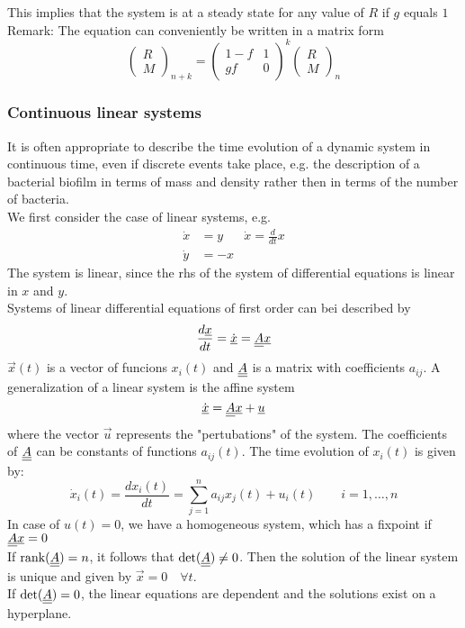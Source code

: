 This implies that the system is at a steady state for any value of $R$ if $g$ equals $\num{1}$\\
Remark: The equation can conveniently be written in a matrix form
\begin{equation*}
	\begin{pmatrix} R \\ M\end{pmatrix}_{n+k}=\begin{pmatrix} 1-f & 1 \\ gf & 0 \end{pmatrix}^k\begin{pmatrix}R\\ M\end{pmatrix}_n
\end{equation*}
\subsubsection{Continuous linear systems}
It is often appropriate to describe the time evolution of a dynamic system in continuous time, even if discrete events take place, e.g. the description of a bacterial biofilm in terms of mass and density rather then in terms of the number of bacteria.\\
We first consider the case of linear systems, e.g.
\begin{align*}
	\dot{x}&=y &\dot{x}=\frac{d}{dt}x\\
	\dot{y}&=-x
\end{align*}
The system is linear, since the rhs of the system of differential equations is linear in $x$ and $y$.\\
Systems of linear differential equations of first order can bei described by 
\begin{equation*}
	\frac{d\underline{\smash{x}}}{dt}=\dot{\underline{\smash{x}}}=\underline{\underline{A}}\underline{\smash{x}}
\end{equation*}
$\vec{x}(t)$ is a vector of funcions $x_i(t)$ and $\underline{\underline{A}}$ is a matrix with coefficients $a_{ij}$. A generalization of a linear system is the affine system
\begin{equation*}
	\dot{\underline{\smash{x}}}=\underline{\underline{A}}\underline{\smash{x}}+\underline{\smash{u}}
\end{equation*}
where the vector $\vec{u}$ represents the "pertubations"{} of the system. The coefficients of $\underline{\underline{A}}$ can be constants of functions $a_{ij}(t)$. The time evolution of $x_i(t)$ is given by:
\begin{equation*}
	\dot{x}_i(t)=\frac{dx_i(t)}{dt}=\sum\limits_{j=1}^na_{ij}x_j(t)+u_i(t) \qquad i=1,\ldots ,n
\end{equation*}
In case of $u(t)=0$, we have a homogeneous system, which has a fixpoint if $\underline{\underline{A}}\underline{\smash{x}}=0$\\
If $\text{rank}(\underline{\underline{A}})=n$, it follows that $\text{det}(\underline{\underline{A}})\neq 0$. Then the solution of the linear system is unique and given by $\vec{x}=0\quad \forall t$.\\
If $\text{det}(\underline{\underline{A}})=0$, the linear equations are dependent and the solutions exist on a hyperplane.
